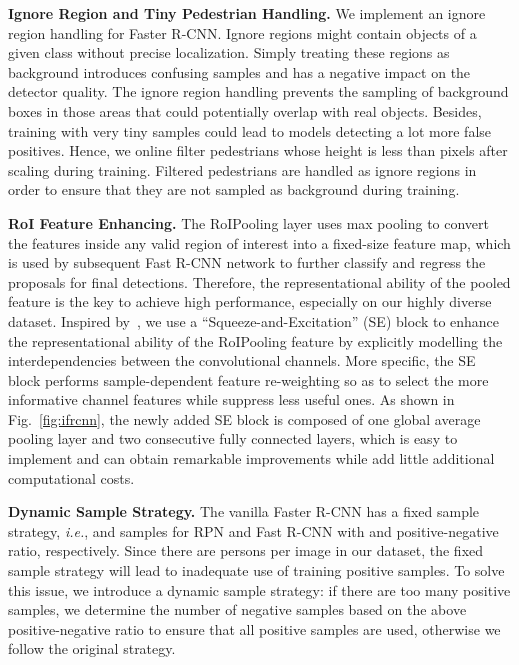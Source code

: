 \documentclass[journal]{IEEEtran}
\def\ie{{\em i.e.}}
\begin{document}
{\flushleft \textbf{Ignore Region and Tiny Pedestrian Handling.}}
We implement an ignore region handling for Faster R-CNN. Ignore regions might contain objects of a given class without precise localization. Simply treating these regions as background introduces confusing samples and has a negative impact on the detector quality. The ignore region handling prevents the sampling of background boxes in those areas that could potentially overlap with real objects. Besides, training with very tiny samples could lead to models detecting a lot more false positives. Hence, we online filter pedestrians whose height is less than  pixels after scaling during training. Filtered pedestrians are handled as ignore regions in order to ensure that they are not sampled as background during training.

{\flushleft \textbf{RoI Feature Enhancing.}}
The RoIPooling layer uses max pooling to convert the features inside any valid region of interest into a fixed-size feature map, which is used by subsequent Fast R-CNN network to further classify and regress the proposals for final detections. Therefore, the representational ability of the pooled feature is the key to achieve high performance, especially on our highly diverse dataset. Inspired by~\cite{DBLP:journals/corr/abs-1709-01507, DBLP:conf/cvpr/ZhangYS18}, we use a ``Squeeze-and-Excitation'' (SE) block to enhance the representational ability of the RoIPooling feature by explicitly modelling the interdependencies between the convolutional channels. More specific, the SE block performs sample-dependent feature re-weighting so as to select the more informative channel features while suppress less useful ones. As shown in Fig.~\ref{fig:ifrcnn}, the newly added SE block is composed of one global average pooling layer and two consecutive fully connected layers, which is easy to implement and can obtain remarkable improvements while add little additional computational costs.

{\flushleft \textbf{Dynamic Sample Strategy.}}
The vanilla Faster R-CNN has a fixed sample strategy, \ie,  and  samples for RPN and Fast R-CNN with  and  positive-negative ratio, respectively. Since there are  persons per image in our dataset, the fixed sample strategy will lead to inadequate use of training positive samples. To solve this issue, we introduce a dynamic sample strategy: if there are too many positive samples, we determine the number of negative samples based on the above positive-negative ratio to ensure that all positive samples are used, otherwise we follow the original strategy.
\end{document}
